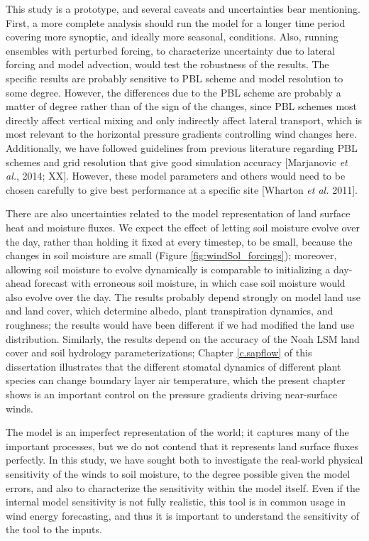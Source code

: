 This study is a prototype, and several caveats and uncertainties bear mentioning.  First, a more complete analysis should run the model for a longer time period covering more synoptic, and ideally more seasonal, conditions.  Also, running ensembles with perturbed forcing, to characterize uncertainty due to lateral forcing and model advection, would test the robustness of the results.  The specific results are probably sensitive to PBL scheme and model resolution to some degree.  However, the differences due to the PBL scheme are probably a matter of degree rather than of the sign of the changes, since PBL schemes most directly affect vertical mixing and only indirectly affect lateral transport, which is most relevant to the horizontal pressure gradients controlling wind changes here.  Additionally, we have followed guidelines from previous literature regarding PBL schemes and grid resolution that give good simulation accuracy [Marjanovic \textit{et al.}, 2014; XX].  However, these model parameters and others would need to be chosen carefully to give best performance at a specific site [Wharton \textit{et al.} 2011].

There are also uncertainties related to the model representation of land surface heat and moisture fluxes.  We expect the effect of letting soil moisture evolve over the day, rather than holding it fixed at every timestep, to be small, because the changes in soil moisture are small (Figure \ref{fig:windSol_forcings}); moreover, allowing soil moisture to evolve dynamically is comparable to initializing a day-ahead forecast with erroneous soil moisture, in which case soil moisture would also evolve over the day.  The results probably depend strongly on model land use and land cover, which determine albedo, plant transpiration dynamics, and roughness; the results would have been different if we had modified the land use distribution.  Similarly, the results depend on the accuracy of the Noah LSM land cover and soil hydrology parameterizations; Chapter \ref{c.sapflow} of this dissertation illustrates that the different stomatal dynamics of different plant species can change boundary layer air temperature, which the present chapter shows is an important control on the pressure gradients driving near-surface winds.

The model is an imperfect representation of the world; it captures many of the important processes, but we do not contend that it represents land surface fluxes perfectly.  In this study, we have sought both to investigate the real-world physical sensitivity of the winds to soil moisture, to the degree possible given the model errors, and also to characterize the sensitivity within the model itself.  Even if the internal model sensitivity is not fully realistic, this tool is in common usage in wind energy forecasting, and thus it is important to understand the sensitivity of the tool to the inputs.


